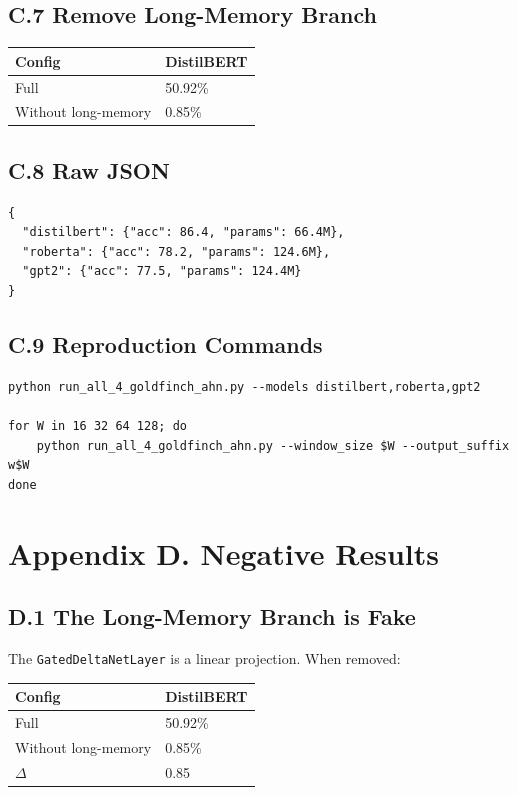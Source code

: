 \subsection{C.7 Remove Long-Memory Branch}

\begin{table}[H]
\centering
\small
\begin{tabular}{ll}
\toprule
\textbf{Config} & \textbf{DistilBERT} \\
\midrule
Full & 50.92\% \\
Without long-memory & 0.85\% \\
\bottomrule
\end{tabular}
\end{table}

\subsection{C.8 Raw JSON}

\begin{lstlisting}
{
  "distilbert": {"acc": 86.4, "params": 66.4M},
  "roberta": {"acc": 78.2, "params": 124.6M},
  "gpt2": {"acc": 77.5, "params": 124.4M}
}
\end{lstlisting}

\subsection{C.9 Reproduction Commands}

\begin{lstlisting}
python run_all_4_goldfinch_ahn.py --models distilbert,roberta,gpt2

for W in 16 32 64 128; do
    python run_all_4_goldfinch_ahn.py --window_size $W --output_suffix w$W
done
\end{lstlisting}




\section{Appendix D. Negative Results}

\subsection{D.1 The Long-Memory Branch is Fake}

The \texttt{GatedDeltaNetLayer} is a linear projection. When removed:

\begin{table}[H]
\centering
\small
\begin{tabular}{ll}
\toprule
\textbf{Config} & \textbf{DistilBERT} \\
\midrule
Full & 50.92\% \\
Without long-memory & 0.85\% \\
$\Delta$ & 0.85 \\
\bottomrule
\end{tabular}
\end{table}

